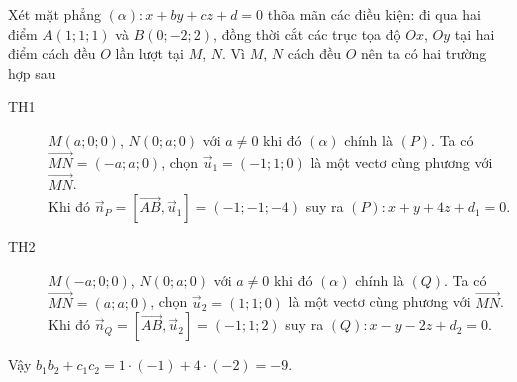 \begin{ex}
{Xét mặt phẳng $\left(\alpha\right) \colon x+by+cz+d=0$ thõa mãn các điều kiện: đi qua hai điểm $A \left(1;1;1\right)$ và $B\left(0;-2;2\right)$, đồng thời cắt các trục tọa độ $Ox$, $Oy$ tại hai điểm cách đều $O$ lần lượt tại $M$, $N$. Vì $M$, $N$ cách đều $O$ nên ta có hai trường hợp sau
\begin{description}
\item[TH1] $M \left(a;0;0\right)$, $N \left(0;a;0\right)$ với $a \neq 0$ khi đó $\left(\alpha\right)$ chính là $\left(P\right)$. Ta có $\overrightarrow{MN} = \left(-a;a;0\right)$, chọn $\overrightarrow{u}_1 = \left(-1;1;0\right)$ là một vectơ cùng phương với $\overrightarrow{MN}$.\\
Khi đó $\overrightarrow{n}_P = \left[\overrightarrow{AB},\overrightarrow{u}_1\right] = \left(-1;-1;-4\right)$
suy ra $\left(P\right) \colon x+y+4z+d_1 = 0$.
\item[TH2] $M \left(-a;0;0\right)$, $N \left(0;a;0\right)$ với $a \neq 0$ khi đó $\left(\alpha\right)$ chính là $\left(Q\right)$. Ta có $\overrightarrow{MN} = \left(a;a;0\right)$, chọn $\overrightarrow{u}_2 = \left(1;1;0\right)$ là một vectơ cùng phương với $\overrightarrow{MN}$.\\
Khi đó $\overrightarrow{n}_Q = \left[\overrightarrow{AB},\overrightarrow{u}_2\right] = \left(-1;1;2\right)$
suy ra $\left(Q\right) \colon x-y-2z+d_2 = 0$.
\end{description}
Vậy $b_1b_2 + c_1c_2 = 1 \cdot \left(-1\right) + 4 \cdot \left(-2\right) = -9$.
}
\end{ex}

